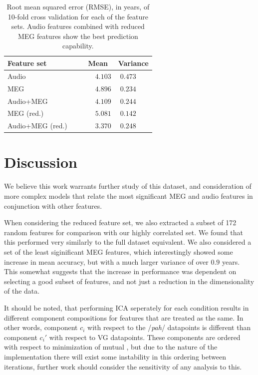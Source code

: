 \documentclass[a4paper]{article}
\begin{document}
\begin{table}[t]
  \caption{Root mean squared error (RMSE), in years, of 10-fold cross validation for each of the feature sets. Audio features combined with reduced MEG features show the best prediction capability.}
  \label{tab:rmse}
  \centering
  \begin{tabular}{ l@{}c  c }
    \toprule
    \multicolumn{1}{l}{\textbf{Feature set}} & \multicolumn{1}{c}{\textbf{Mean}} & \multicolumn{1}{c}{\textbf{Variance}} \\
    \midrule
    Audio~~~                             & ~~~$4.103$         &     $0.473$~~~       \\
    MEG~~~                               & ~~~$4.896$         &     $0.234$~~~       \\
    Audio+MEG~~~                         & ~~~$4.109$         &     $0.244$~~~       \\

    MEG (red.)~~~                        & ~~~$5.081$         &     $0.142$~~~       \\
    Audio+MEG (red.)~~~                  & ~~~$3.370$         &     $0.248$~~~       \\
    \bottomrule
  \end{tabular}
\end{table}

\section{Discussion}

We believe this work warrants further study of this dataset, and consideration of more complex models that relate the most significant MEG and audio features in conjunction with other features.

When considering the reduced feature set, we also extracted a subset of 172 random features for comparison with our highly correlated set. We found that this performed very similarly to the full dataset equivalent. We also considered a set of the least siginificant MEG features, which interestingly showed some increase in mean accuracy, but with a much larger variance of over $0.9$ years. This somewhat suggests that the increase in performance was dependent on selecting a good subset of features, and not just a reduction in the dimensionality of the data.

It should be noted, that performing ICA seperately for each condition results in different component compositions for features that are treated as the same. In other words, component $c_i$ with respect to the /{\em pah}/ datapoints is different than component $c_i'$ with respect to VG datapoints. These components are ordered with respect to minimization of mutual , but due to the nature of the implementation there will exist some instability in this ordering between iterations, further work should consider the sensitivity of any analysis to this.
\end{document}
